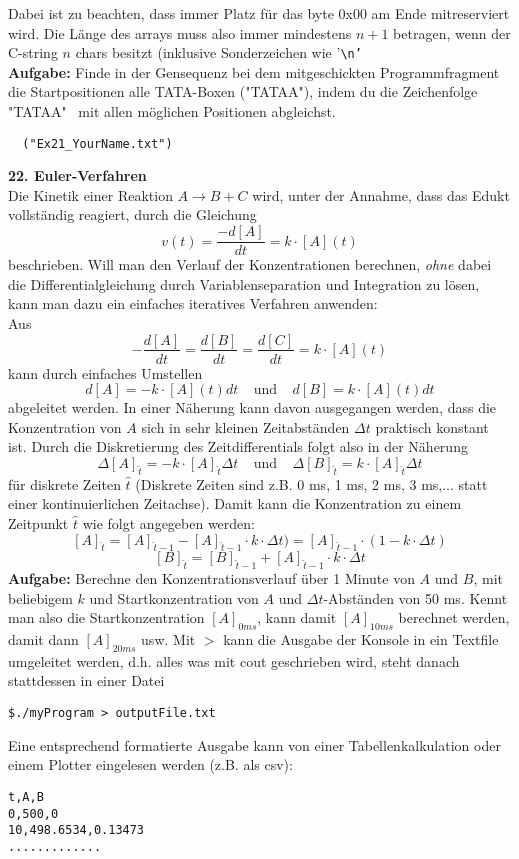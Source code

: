 \documentclass[paper=A4, pagesize, DIV=calc, smallheadings,
fontsize=11pt, expansion=false]{scrreprt}
\begin{document}
Dabei ist zu beachten, dass immer Platz für das byte 0x00 am Ende mitreserviert wird. Die Länge des arrays muss also immer mindestens $n+1$ betragen, wenn der C-string $n$ chars besitzt (inklusive Sonderzeichen wie '\texttt{\textbackslash n'}\\
\textbf{Aufgabe:} Finde in der Gensequenz bei dem mitgeschickten Programmfragment die Startpositionen alle TATA-Boxen ("TATAA"), indem du die Zeichenfolge "TATAA"~ mit allen möglichen Positionen abgleichst.
\vspace{-1ex}
\begin{verbatim}
  ("Ex21_YourName.txt")
\end{verbatim} 

 \textbf{22. Euler-Verfahren}\\
  Die Kinetik einer Reaktion $ A\longrightarrow B + C$ wird, 
unter der Annahme, dass das Edukt vollständig reagiert, durch die Gleichung 
\[v(t) = \frac{-d[A]}{dt} = k \cdot [A](t) \]
beschrieben. Will man den Verlauf der Konzentrationen berechnen,
 \emph{ohne} dabei die Differentialgleichung durch Variablenseparation und Integration zu lösen,
 kann man dazu ein einfaches iteratives Verfahren anwenden:\\ 
Aus
\[ - \frac{d[A]}{dt} = \frac{d[B]}{dt} = \frac{d[C]}{dt} = k \cdot [A](t) \] 
kann durch einfaches Umstellen
\[d[A] = - k \cdot [A](t) dt ~~~~~\mathrm{und}~~~~~ d[B] = k \cdot [A](t) dt \] 
abgeleitet werden. In einer Näherung kann davon ausgegangen werden, dass die Konzentration von $A$
sich in sehr kleinen Zeitabständen $\Delta t$ praktisch konstant ist. Durch die Diskretierung des Zeitdifferentials folgt also in der Näherung
\[\Delta[A]_{\hat{t}} = - k \cdot [A]_{\hat{t}} \Delta t ~~~~~ \mathrm{und} ~~~~~ \Delta[B]_{\hat{t}} = k \cdot [A]_{\hat{t}} \Delta t \] 
für diskrete Zeiten $\hat{t}$ (Diskrete Zeiten sind z.B. 0 ms, 1 ms, 2 ms, 3 ms,... statt einer kontinuierlichen Zeitachse).
Damit kann die Konzentration zu einem Zeitpunkt $\hat{t}$ wie folgt angegeben werden:
\[ [A]_{\hat{t}} =  [A]_{\hat{t}-1}  - [A]_{\hat{t}-1} \cdot k \cdot \Delta t) = [A]_{\hat{t}-1} \cdot (1 - k \cdot \Delta t)  \] 
\[ [B]_{\hat{t}} = [B]_{\hat{t}-1} + [A]_{\hat{t}-1} \cdot k \cdot \Delta t \]
\textbf{Aufgabe:} Berechne den Konzentrationsverlauf über 1 Minute von $A$ und $B$, mit beliebigem $k$ und Startkonzentration von $A$ und $\Delta t$-Abständen von 50 ms. Kennt man also die Startkonzentration $[A]_{0 ms}$, kann damit $[A]_{10 ms}$ berechnet werden, damit dann $[A]_{20 ms}$ usw.
Mit $>$ kann die Ausgabe der Konsole in ein Textfile umgeleitet werden, d.h. alles was mit cout geschrieben wird, steht danach stattdessen in einer Datei
\begin{verbatim}
$./myProgram > outputFile.txt
\end{verbatim}
Eine entsprechend formatierte Ausgabe kann von einer Tabellenkalkulation oder einem Plotter eingelesen werden (z.B. als csv):
\begin{verbatim}
t,A,B
0,500,0
10,498.6534,0.13473
.............
\end{verbatim}
\end{document}
